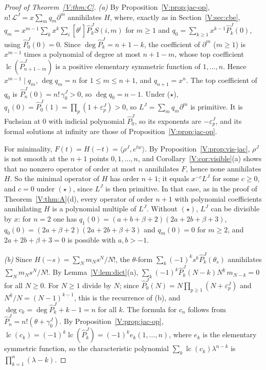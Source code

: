 \documentclass[11pt,a4paper]{article}
\theoremstyle{definition}
\theoremstyle{remark}
\newcommand{\ff}[2]{#1^{\underline{#2}}}
\DeclareMathOperator{\lc}{lc}
\numberwithin{equation}{section}
\begin{document}
\begin{proof}[Proof of Theorem~\ref{V:thm:C}]
\emph{(a)} By Proposition~\ref{V:prop:jac-op}, $n!\,\mathcal L^J=x\sum_mq_m\partial^m$ annihilates $H$, where, exactly as in Section~\ref{V:sec:cbe}, $q_m=x^{m-1}\sum_kx^k\sum_i[\theta^i]\hat P^J_kS(i,m)$ for $m\ge1$ and $q_0=\sum_{k\ge1}x^{k-1}\hat P^J_k(0)$, using $\hat P^J_0(0)=0$. Since $\deg\hat P^J_k=n+1-k$, the coefficient of $\partial^m$ ($m\ge1$) is $x^{m-1}$ times a polynomial of degree at most $n+1-m$, whose top coefficient $\lc(\hat P^J_{n+1-m})$ is a positive elementary symmetric function of $1,\dots,n$. Hence $x^{m-1}\mid q_m$, $\deg q_m=n$ for $1\le m\le n+1$, and $q_{n+1}=x^n$. The top coefficient of $q_0$ is $\hat P^J_n(0)=n!\,\gamma^J_0>0$, so $\deg q_0=n-1$. Under \textup{($\star$)}, $q_1(0)=\hat P^J_0(1)=\prod_p(1+\varepsilon^J_p)>0$, so $L^J=\sum_mq_m\partial^m$ is primitive. It is Fuchsian at $0$ with indicial polynomial $\hat P^J_0$, so its exponents are $-\varepsilon^J_p$, and its formal solutions at infinity are those of Proposition~\ref{V:prop:jac-op}.

For minimality, $F(t)=H(-t)=\langle\rho^J,e^{tw}\rangle$. By Proposition~\ref{V:prop:vis-jac}, $\rho^J$ is not smooth at the $n+1$ points $0,1,\dots,n$, and Corollary~\ref{V:cor:visible}(a) shows that no nonzero operator of order at most $n$ annihilates $F$, hence none annihilates $H$. So the minimal operator of $H$ has order $n+1$; it equals $x^{-c}L^J$ for some $c\ge0$, and $c=0$ under $(\star)$, since $L^J$ is then primitive. In that case, as in the proof of Theorem~\ref{V:thm:A}(d), every operator of order $n+1$ with polynomial coefficients annihilating $H$ is a polynomial multiple of $L^J$. Without $(\star)$, $L^J$ can be divisible by $x$: for $n=2$ one has $q_1(0)=(a+b+\beta+2)(2a+2b+\beta+3)$, $q_0(0)=(2a+\beta+2)(2a+2b+\beta+3)$ and $q_m(0)=0$ for $m\ge2$, and $2a+2b+\beta+3=0$ is possible with $a,b>-1$.

\emph{(b)} Since $H(-s)=\sum_Nm_Ns^N/N!$, the $\theta$-form $\sum_k(-1)^ks^k\hat P^J_k(\theta_s)$ annihilates $\sum_Nm_Ns^N/N!$. By Lemma~\ref{V:lem:dict}(a), $\sum_k(-1)^k\hat P^J_k(N-k)\ff Nk\,m_{N-k}=0$ for all $N\ge0$. For $N\ge1$ divide by $N$; since $\hat P^J_0(N)=N\prod_{p\ge1}(N+\varepsilon^J_p)$ and $\ff Nk/N=\ff{(N-1)}{k-1}$, this is the recurrence of (b), and $\deg c_k=\deg\hat P^J_k+k-1=n$ for all $k$. The formula for $c_n$ follows from $\hat P^J_n=n!(\theta+\gamma^J_0)$. By Proposition~\ref{V:prop:jac-op}, $\lc(c_k)=(-1)^k\lc(\hat P^J_k)=(-1)^ke_k(1,\dots,n)$, where $e_k$ is the elementary symmetric function, so the characteristic polynomial $\sum_k\lc(c_k)\lambda^{n-k}$ is $\prod_{k=1}^{n}(\lambda-k)$.


\end{proof}
\end{document}

